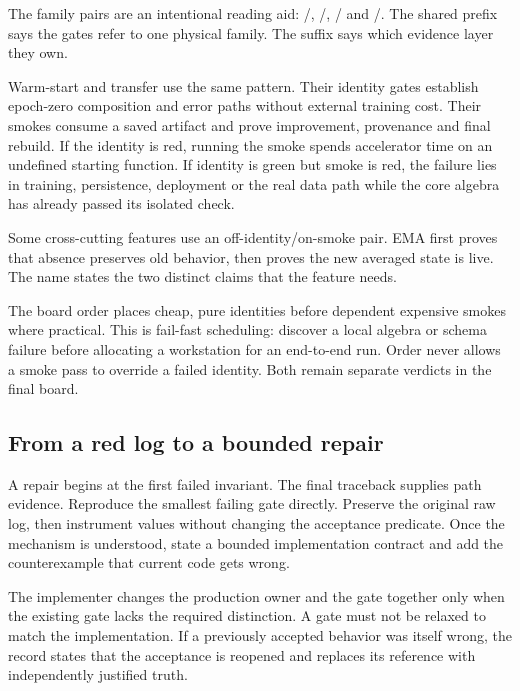 The family pairs are an intentional reading aid:
/,
/,
/ and
/.  The shared prefix says the gates refer
to one physical family.  The suffix says which evidence layer they own.

Warm-start and transfer use the same pattern.  Their identity gates establish
epoch-zero composition and error paths without external training cost.  Their
smokes consume a saved artifact and prove improvement, provenance and final
rebuild.  If the identity is red, running the smoke spends accelerator time on
an undefined starting function.  If identity is green but smoke is red, the
failure lies in training, persistence, deployment or the real data path
while the core algebra has already passed its isolated check.

Some cross-cutting features use an off-identity/on-smoke pair.  EMA
first proves that absence preserves old behavior, then proves the new averaged
state is live.  The name states the two distinct claims that the feature needs.

The board order places cheap, pure identities before dependent expensive
smokes where practical.  This is fail-fast scheduling: discover a local
algebra or schema failure before allocating a workstation for an end-to-end
run.  Order never allows a smoke pass to override a failed identity.  Both
remain separate verdicts in the final board.

\subsection{From a red log to a bounded repair}

A repair begins at the first failed invariant.  The final traceback supplies
path evidence.  Reproduce the smallest failing gate directly.  Preserve the original raw log,
then instrument values without changing the acceptance predicate.  Once the
mechanism is understood, state a bounded implementation contract and add the
counterexample that current code gets wrong.

The implementer changes the production owner and the gate together only when
the existing gate lacks the required distinction.  A gate must not be relaxed
to match the implementation.  If a previously accepted behavior was itself
wrong, the record states that the acceptance is reopened and replaces its
reference with independently justified truth.

